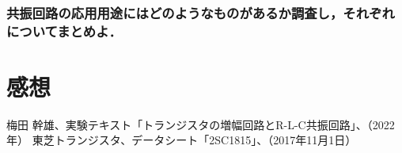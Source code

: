 \documentclass[dvipdfmx,titlepage,a4j]{jsarticle}  %
\numberwithin{equation}{section}
\begin{document}
\subsubsection{共振回路の応用用途にはどのようなものがあるか調査し，それぞれについてまとめよ．}

\section{感想}

\begin{thebibliography}{99}
   梅田 幹雄、実験テキスト「トランジスタの増幅回路とR-L-C共振回路」、（2022年）
   東芝トランジスタ、データシート「2SC1815」、（2017年11月1日）
\end{thebibliography}
\end{document}
